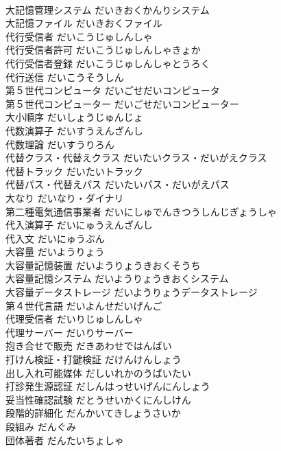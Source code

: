 \documentclass[8pt]{extreport}
\begin{document}
\begin{CJK}{UTF8}{min}
\\	大記憶管理システム	だいきおくかんりシステム	
\\	大記憶ファイル	だいきおくファイル	
\\	代行受信者	だいこうじゅしんしゃ	
\\	代行受信者許可	だいこうじゅしんしゃきょか	
\\	代行受信者登録	だいこうじゅしんしゃとうろく	
\\	代行送信	だいこうそうしん	
\\	第５世代コンピュータ	だいごせだいコンピュータ	
\\	第５世代コンピューター	だいごせだいコンピューター	
\\	大小順序	だいしょうじゅんじょ	
\\	代数演算子	だいすうえんざんし	
\\	代数理論	だいすうりろん	
\\	代替クラス・代替えクラス	だいたいクラス・だいがえクラス	
\\	代替トラック	だいたいトラック	
\\	代替パス・代替えパス	だいたいパス・だいがえパス	
\\	大なり	だいなり・ダイナリ	
\\	第二種電気通信事業者	だいにしゅでんきつうしんじぎょうしゃ	
\\	代入演算子	だいにゅうえんざんし	
\\	代入文	だいにゅうぶん	
\\	大容量	だいようりょう	
\\	大容量記憶装置	だいようりょうきおくそうち	
\\	大容量記憶システム	だいようりょうきおくシステム	
\\	大容量データストレージ	だいようりょうデータストレージ	
\\	第４世代言語	だいよんせだいげんご	
\\	代理受信者	だいりじゅしんしゃ	
\\	代理サーバー	だいりサーバー	
\\	抱き合せで販売	だきあわせではんばい	
\\	打けん検証・打鍵検証	だけんけんしょう	
\\	出し入れ可能媒体	だしいれかのうばいたい	
\\	打診発生源認証	だしんはっせいげんにんしょう	
\\	妥当性確認試験	だとうせいかくにんしけん	
\\	段階的詳細化	だんかいてきしょうさいか	
\\	段組み	だんぐみ	
\\	団体著者	だんたいちょしゃ	

\end{CJK}
\end{document}
